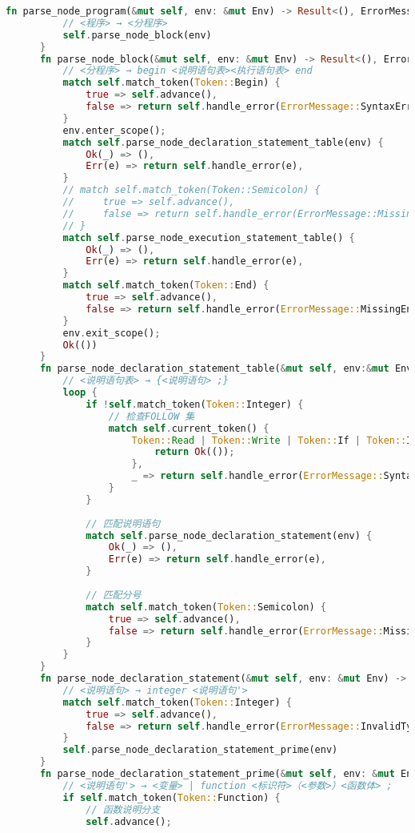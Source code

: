 \begin{lstlisting}[caption={语法分析器parse.rs}, label={4:code-example}, captionpos=t, language=rust]
      fn parse_node_program(&mut self, env: &mut Env) -> Result<(), ErrorMessage>{
          // <程序> → <分程序>
          self.parse_node_block(env)
      }
      fn parse_node_block(&mut self, env: &mut Env) -> Result<(), ErrorMessage>{
          // <分程序> → begin <说明语句表><执行语句表> end
          match self.match_token(Token::Begin) {
              true => self.advance(),
              false => return self.handle_error(ErrorMessage::SyntaxErrorExpectedABlock)
          }
          env.enter_scope();
          match self.parse_node_declaration_statement_table(env) {
              Ok(_) => (),
              Err(e) => return self.handle_error(e),
          }
          // match self.match_token(Token::Semicolon) {
          //     true => self.advance(),
          //     false => return self.handle_error(ErrorMessage::MissingSemicolon),
          // }
          match self.parse_node_execution_statement_table() {
              Ok(_) => (),
              Err(e) => return self.handle_error(e),
          }
          match self.match_token(Token::End) {
              true => self.advance(),
              false => return self.handle_error(ErrorMessage::MissingEnd)
          }
          env.exit_scope();
          Ok(())
      }
      fn parse_node_declaration_statement_table(&mut self, env:&mut Env) -> Result<(), ErrorMessage>{
          // <说明语句表> → {<说明语句> ;}
          loop {
              if !self.match_token(Token::Integer) {
                  // 检查FOLLOW 集
                  match self.current_token() {
                      Token::Read | Token::Write | Token::If | Token::Identifier(_) | Token::End | Token::Eof => {
                          return Ok(());
                      },
                      _ => return self.handle_error(ErrorMessage::SyntaxError),
                  }
              }
              
              // 匹配说明语句
              match self.parse_node_declaration_statement(env) {
                  Ok(_) => (),
                  Err(e) => return self.handle_error(e),
              }
              
              // 匹配分号
              match self.match_token(Token::Semicolon) {
                  true => self.advance(),
                  false => return self.handle_error(ErrorMessage::MissingSemicolon),
              }
          }
      }
      fn parse_node_declaration_statement(&mut self, env: &mut Env) -> Result<(), ErrorMessage>{
          // <说明语句> → integer <说明语句'>
          match self.match_token(Token::Integer) {
              true => self.advance(),
              false => return self.handle_error(ErrorMessage::InvalidTypeExpectedInterger)
          }
          self.parse_node_declaration_statement_prime(env)
      }
      fn parse_node_declaration_statement_prime(&mut self, env: &mut Env) -> Result<(), ErrorMessage>{
          // <说明语句'> → <变量> | function <标识符>（<参数>）<函数体> ;
          if self.match_token(Token::Function) {
              // 函数说明分支
              self.advance();
  

\end{lstlisting}
